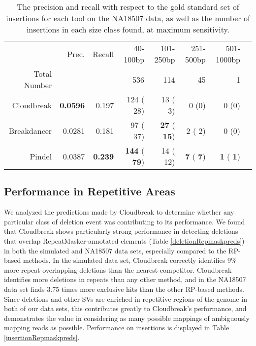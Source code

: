 \documentclass[11pt]{article}
\begin{document}
\begin{table}[t]
\begin{center}
\begin{tabular}{rrr|rrrrr}
  \hline
 & Prec. & Recall & 40-100bp & 101-250bp & 251-500bp & 501-1000bp \\ 
Total Number & & & 536 & 114 & 45 & 1 \\
  \hline
Cloudbreak & \textbf{0.0596} & 0.197 &  124 (  28)  &   13 (   3) &  0 (0) & 0 (0) \\ 
Breakdancer & 0.0281 & 0.181 &   97 (  37)  & \textbf{  27} (\textbf{  15}) &     2 (   2) & 0 (0) \\  
  Pindel & 0.0387 & \textbf{0.239} & \textbf{ 144} (\textbf{  79})  &   14 (  12) &  \textbf{   7} (\textbf{   7}) & \textbf{   1} (\textbf{   1})  \\ 
   \hline
\end{tabular}
\end{center}
\caption{The precision and recall with respect to the gold standard set of insertions for each tool on the NA18507 data, as well as the number of insertions in each size class found, at maximum sensitivity.}
\label{NA18507InsertionPreds}
\end{table}

\subsection{Performance in Repetitive Areas}

We analyzed the predictions made by Cloudbreak to determine whether any particular class of deletion event was contributing to its performance. We found that Cloudbreak shows particularly strong performance in detecting deletions that overlap RepeatMasker-annotated elements (Table \ref{deletionRepmaskpreds}) in both the simulated and NA18507 data sets, especially compared to the RP-based methods. In the simulated data set, Cloudbreak correctly identifies 9\% more repeat-overlapping deletions than the nearest competitor. Cloudbreak identifies more deletions in repeats than any other method, and in the NA18507 data set finds 3.75 times more exclusive hits than the other RP-based methods. Since deletions and other SVs are enriched in repetitive regions of the genome in both of our data sets, this contributes greatly to Cloudbreak's performance, and demonstrates the value in considering as many possible mappings of ambiguously mapping reads as possible. Performance on insertions is displayed in Table \ref{insertionRepmaskpreds}.
\end{document}
